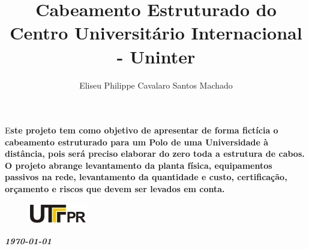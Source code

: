 \documentclass[	DIV=calc,%
							paper=a4,%
							fontsize=12pt,%
							onecolumn]{scrartcl}	 					%
\title{Cabeamento Estruturado do Centro Universitário Internacional - Uninter}					%
\author{Eliseu Philippe Cavalaro Santos Machado}  	%
\date{}
\newcommand{\initial}[1]{%
     \lettrine[lines=3,lhang=0.3,nindent=0em]{
     				\color{DarkGoldenrod}
     				{\textsf{#1}}}{}}
\begin{document}
\maketitle
\thispagestyle{fancy} 	
\thispagestyle{empty}		%




\initial{E}\textbf{ste projeto tem como objetivo de apresentar de forma fictícia o cabeamento estruturado para um Polo de uma Universidade à distância, pois será preciso elaborar do zero toda a estrutura de cabos.
	O projeto abrange levantamento da planta física, equipamentos passivos na rede, levantamento da quantidade e custo, certificação, orçamento e riscos que devem ser levados em conta.}

\begin{figure}
	\centering
	\includegraphics{utfpr}
\end{figure}

\vspace{3cm}
\centerline{\textit{\textbf{\today}}}

\clearpage
    \renewcommand*\listfigurename{Lista de figuras}
\listoffigures

\renewcommand*\listtablename{Lista de tabelas}
\listoftables




\clearpage
\renewcommand{\contentsname}{Sumário}
\tableofcontents
\clearpage

\end{document}
